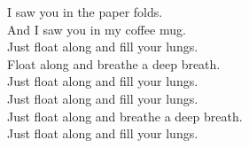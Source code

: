 I saw you in the paper folds. \\
And I saw you in my coffee mug. \\
Just float along and fill your lungs. \\
Float along and breathe a deep breath. \\

Just float along and fill your lungs. \\
Just float along and fill your lungs. \\
Just float along and breathe a deep breath. \\
Just float along and fill your lungs. \\
